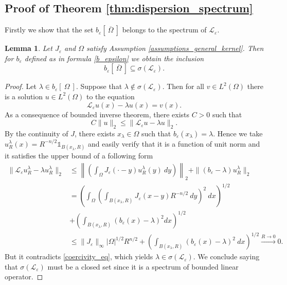 \documentclass[12pt, a4paper]{article}
\theoremstyle{break}
\theoremstyle{break}
\theoremstyle{break}
\theoremstyle{break}
\newtheorem{lem}{Lemma}[section]
\theoremstyle{break}
\newcommand{\Leo}{\mathcal{L}_{\varepsilon}}
\newcommand{\Leb}{L^2\left(\Omega\right)}
\begin{document}
\subsection{Proof of Theorem \ref{thm:dispersion_spectrum}}

Firstly we show that the set $b_\varepsilon \left[\: \overline{\Omega} \:\right]$ belongs to the spectrum of $\Leo$.

\begin{lem} \label{lem:spectrum_inclusion}
    Let $J_\varepsilon$ and $\Omega$ satisfy Assumption \ref{assumptions_general_kernel}. Then for $b_\varepsilon$ defined as in formula \eqref{b_epsilon} we obtain the inclusion
    \begin{equation*}
        b_\varepsilon\left[\:\overline{\Omega}\:\right] \subseteq \sigma(\Leo).
    \end{equation*}
\end{lem} 
\begin{proof}
    Let $\lambda \in b_\varepsilon\left[\:\Omega\:\right]$. Suppose that $\lambda \notin \sigma(\Leo)$. Then for all $v \in \Leb$ there is a solution $u \in \Leb$ to the equation
    $$\Leo u (x) - \lambda u(x) = v(x).$$
    As a consequence of bounded inverse theorem, there exists $C > 0$ such that
    \begin{equation}
        C \|u\|_2 \leq \|\Leo u - \lambda u\|_2 \label{coercivity_eq}.
    \end{equation}
    By the continuity of $J$, there exists $x_\lambda \in \Omega$ such that $b_\varepsilon(x_\lambda) = \lambda$. Hence we take $u_R^\lambda(x) = R^{-n/2} \mathds{1}_{B(x_\lambda, R)}$ and easily verify that it is a function of unit norm and it satisfies the upper bound of a following form
    \begin{align*}
        \|\Leo u_R^{\lambda} - \lambda u_R^{\lambda}\|_2
        &\leq \left\| \left( \int_{\Omega} J_{\varepsilon}(\cdot-y) u_R^{\lambda}(y)\:dy \right)\right\|_2 + \|\left(b_\varepsilon - \lambda\right) u_R^\lambda\|_2 \\
        &= \left(\int_\Omega\left(\int_{B(x_\lambda, R)} J_\varepsilon(x-y) R^{-n/2} \:dy\right)^2\:dx \right)^{1/2} \\
        &+ \left(\int_{B(x_\lambda, R)}\left(b_\varepsilon(x) - \lambda \right)^2dx\right)^{1/2} \\
        &\leq \|J_{\varepsilon}\|_{\infty} |\Omega|^{1/2} R^{n/2} + \left(\int_{B(x_\lambda, R)}\left(b_\varepsilon(x) - \lambda \right)^2 \:dx\right)^{1/2} \xrightarrow{R \rightarrow 0} 0.
    \end{align*}
    But it contradicts \eqref{coercivity_eq}, which yields $\lambda \in \sigma(\Leo)$. We conclude saying that $\sigma(\Leo)$ must be a closed set since it is a spectrum of bounded linear operator.
\end{proof}
\end{document}
